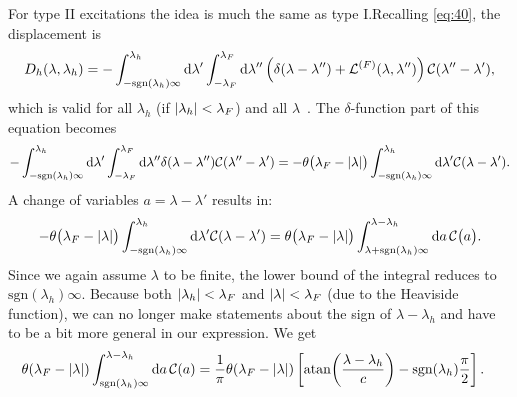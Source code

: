 \documentclass[11pt, a4paper]{report} %
\begin{document}
For type II excitations the idea is much the same as type I.\@ Recalling \cref{eq:40}, the displacement is
\begin{equation}
	D_h\qty(\lambda, \lambda_h) = - \int_{-\textrm{sgn}(\lambda_h)\infty}^{\lambda_h} \dd \lambda' \int_{-\lambda_F}^{\lambda_F} \dd \lambda'' \left(\delta\qty(\lambda-\lambda'') + \mathcal{L}^{(F)}\qty(\lambda,\lambda'') \right)\mathcal{C}\qty(\lambda''-\lambda'),
\end{equation}
which is valid for all \(\lambda_h\) (if \(\abs{\lambda_h} < \lambda_F\)) and all \(\lambda\)~\cite{Caux2015}.
The \(\delta\)-function part of this equation becomes
\begin{align}
	-\int_{-\textrm{sgn}(\lambda_h)\infty}^{\lambda_h} \dd \lambda' \int_{-\lambda_F}^{\lambda_F} \dd \lambda'' \delta\qty(\lambda-\lambda'') \mathcal{C}\qty(\lambda''-\lambda') 
		= - \theta\qty\big(\lambda_F - \abs{\lambda}) \int_{-\textrm{sgn}(\lambda_h)\infty}^{\lambda_h} \dd \lambda'     \mathcal{C}\qty(\lambda-\lambda').
\end{align}
A change of variables \(a=\lambda-\lambda'\) results in:
\begin{align}
	 - \theta\qty\big(\lambda_F - \abs{\lambda}) \int_{-\textrm{sgn}(\lambda_h)\infty}^{\lambda_h} \dd \lambda'     \mathcal{C}\qty(\lambda-\lambda') = 
	  \theta\qty\big(\lambda_F - \abs{\lambda}) \int_{\lambda+\textrm{sgn}(\lambda_h)\infty}^{\lambda-\lambda_h} \dd a \, \mathcal{C}\qty\big(a).
\end{align}
Since we again assume \(\lambda\) to be finite, the lower bound of the integral reduces to \(\textrm{sgn}(\lambda_h)\infty\).
Because both \({\abs{\lambda_h} < \lambda_F}\) and \({\abs{\lambda} < \lambda_F}\) (due to the Heaviside function), we can no longer make statements about the sign of \(\lambda-\lambda_h\) and have to be a bit more general in our expression.
We get
\begin{align}
	  \theta(\lambda_F - \abs{\lambda}) \int_{\textrm{sgn}(\lambda_h)\infty}^{\lambda-\lambda_h} \dd a \, \mathcal{C}(a) 
	  &= \frac{1}{\pi}\theta(\lambda_F - \abs{\lambda}) \left[ \atan(\frac{\lambda-\lambda_h}{c}) - \textrm{sgn}(\lambda_h)\frac{\pi}{2}\right].
\end{align}
\end{document}
